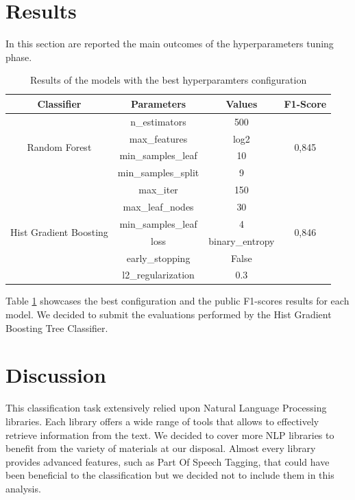 \documentclass[conference]{IEEEtran}
\begin{document}
\section{Results}\label{sec:results}
In this section are reported the main outcomes of the hyperparameters tuning phase.
\begin{table}[h]
\begin{tabular}{@{}cccc@{}}
\toprule
\textbf{Classifier}                          & \textbf{Parameters} & \textbf{Values} & \textbf{F1-Score}      \\ \midrule
\multirow{4}{*}{Random Forest}               & n\_estimators       & 500             & \multirow{4}{*}{0,845} \\
                                             & max\_features       & log2            &                        \\
                                             & min\_samples\_leaf  & 10              &                        \\
                                             & min\_samples\_split & 9               &                        \\ \midrule
\multirow{6}{*}{Hist Gradient Boosting} & max\_iter           & 150             & \multirow{6}{*}{0,846} \\
                                             & max\_leaf\_nodes    & 30              &                        \\
                                             & min\_samples\_leaf  & 4               &                        \\
                                             & loss                & binary\_entropy &                        \\
                                             & early\_stopping     & False           &                        \\
                                             & l2\_regularization  & 0.3             &                        \\ \bottomrule
\end{tabular}
\caption{Results of the models with the best hyperparamters configuration}
\label{tab:results}
\end{table}
Table \ref{tab:results} showcases the best configuration and the public F1-scores results for each model.
We decided to submit the evaluations performed by the Hist Gradient Boosting Tree Classifier.
\section{Discussion}\label{sec:discussion}
This classification task extensively relied upon Natural Language Processing libraries. Each library offers a wide range of tools that allows to effectively retrieve information from the text. We decided to cover more NLP libraries to benefit from the variety of materials at our disposal. Almost every library provides advanced features, such as Part Of Speech Tagging, that could have been beneficial to the classification but we decided not to include them in this analysis. 
\end{document}
